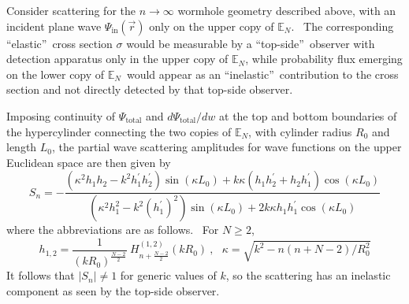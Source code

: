 \documentclass{article}%
\begin{document}
Consider scattering for the $n\rightarrow\infty$ wormhole geometry described
above, with an incident plane wave $\Psi_{\text{in}}\left(  \overrightarrow{r}%
\right)  $ only on the upper copy of $\mathbb{E}_{N}$. \ The corresponding
\textquotedblleft elastic\textquotedblright\ cross section $\sigma$ would be
measurable by a \textquotedblleft top-side\textquotedblright\ observer with
detection apparatus only in the upper copy of $\mathbb{E}_{N}$, while
probability flux emerging on the lower copy of $\mathbb{E}_{N}$\ would appear
as an \textquotedblleft inelastic\textquotedblright\ contribution to the cross
section and not directly detected by that top-side observer.

Imposing continuity of $\Psi_{\text{total}}$ and $d\Psi_{\text{total}}/dw$ at
the top and bottom boundaries of the hypercylinder connecting the two copies
of $\mathbb{E}_{N}$, with cylinder radius $R_{0}$ and length $L_{0}$, the
partial wave scattering amplitudes for wave functions on the upper Euclidean
space are then given by%
\begin{equation}
S_{n}=-\frac{\left(  \kappa^{2}h_{1}h_{2}-k^{2}h_{1}^{\prime}h_{2}^{\prime
}\right)  \sin\left(  \kappa L_{0}\right)  +k\kappa\left(  h_{1}h_{2}^{\prime
}+h_{2}h_{1}^{\prime}\right)  \cos\left(  \kappa L_{0}\right)  }{\left(
\kappa^{2}h_{1}^{2}-k^{2}(h_{1}^{\prime})^{2}\right)  \sin\left(  \kappa
L_{0}\right)  +2k\kappa h_{1}h_{1}^{\prime}\cos\left(  \kappa L_{0}\right)  }
\label{WormholeScatteringAmplitudes}%
\end{equation}
where the abbreviations are as follows. \ For $N\geq2$, \
\begin{equation}
h_{1,2}=\frac{1}{\left(  kR_{0}\right)  ^{\frac{N-2}{2}}}~H_{n+\frac{N-2}{2}%
}^{\left(  1,2\right)  }\left(  kR_{0}\right)  \ ,\ \ \ \kappa=\sqrt
{k^{2}-n\left(  n+N-2\right)  /R_{0}^{2}}%
\end{equation}
It follows that $\left\vert S_{n}\right\vert \neq1$ for generic values of $k$,
so the scattering has an inelastic component as seen by the top-side observer. \ 
\end{document}
